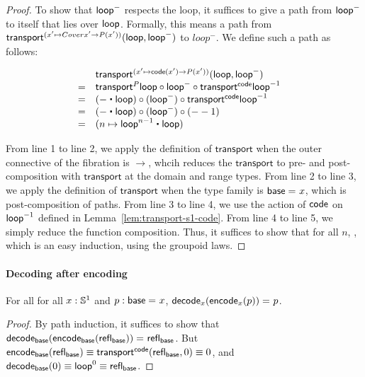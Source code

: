 \begin{proof}
To show that $\mathsf{loop}^-$ respects the loop, it suffices to give a path
from $\mathsf{loop}^-$ to itself that lies over $\mathsf{loop}$. 
Formally, this means a path from $\mathsf{transport}^{(x' \mapsto Cover x'
\rightarrow P(x'))}(\mathsf{loop},\mathsf{loop}^-)$ to $loop^-$.  We define such a
path as follows:

\[
\begin{array}{lll}
  & \transfib {(x' \mapsto \code(x') \rightarrow P(x'))} \lloop {\lloop^-} & \\
= & \transfibf P \lloop \circ {\lloop^-} \circ \transfibf \code {\opp \lloop} & \\
= & (- \ct \lloop) \circ (\lloop^-) \circ \transfibf \code {\opp \lloop} & \\
= & (- \ct \lloop) \circ (\lloop^-) \circ (- - 1) & \\
= & (n \mapsto \lloop^{n - 1} \ct \lloop) \\                       
\end{array}
\]

From line 1 to line 2, we apply the definition of $\mathsf{transport}$
when the outer connective of the fibration is $\rightarrow$, whcih
reduces the $\mathsf{transport}$ to pre- and post-composition with
$\mathsf{transport}$ at the domain and range types.  From line 2 to line
3, we apply the definition of $\mathsf{transport}$ when the type family
is $\mathsf{base} =_{} x$, which is post-composition of paths.  From line 3 to
line 4, we use the action of $\mathsf{code}$ on $\mathord{{\mathsf{loop}}^{-1}}$ defined in
Lemma~\ref{lem:transport-s1-code}.  From line 4 to line 5, we simply
reduce the function composition.  Thus, it suffices to show that for all
$n$, , which is an easy
induction, using the groupoid laws.  
\end{proof}

\paragraph{Decoding after encoding}

\begin{lem} \label{lem:s1-decode-encode}  For all 
for all $x: \mathbb{S} ^1$ and $p : \mathsf{base} =_{} x$, $\mathsf{decode}_x({{\mathsf{encode}_x(p)}}) =_{} p$.  
\end{lem}

\begin{proof}
By path induction, it suffices to show that 
$\mathsf{decode}_{\mathsf{base}}({{\mathsf{encode}_{\mathsf{base}}(\mathsf{refl}_{\mathsf{base}})}}) =_{} \mathsf{refl}_{\mathsf{base}}$.  But
${\mathsf{encode}_{\mathsf{base}}(\mathsf{refl}_{\mathsf{base}})} \equiv 
 \mathsf{transport}^{\mathsf{code}}(\mathsf{refl}_{\mathsf{base}},0) \equiv 0$, and $\mathsf{decode}_{\mathsf{base}}(0)
 \equiv \mathsf{loop}^ 0 \equiv \mathsf{refl}_{\mathsf{base}}$.  
\end{proof}

